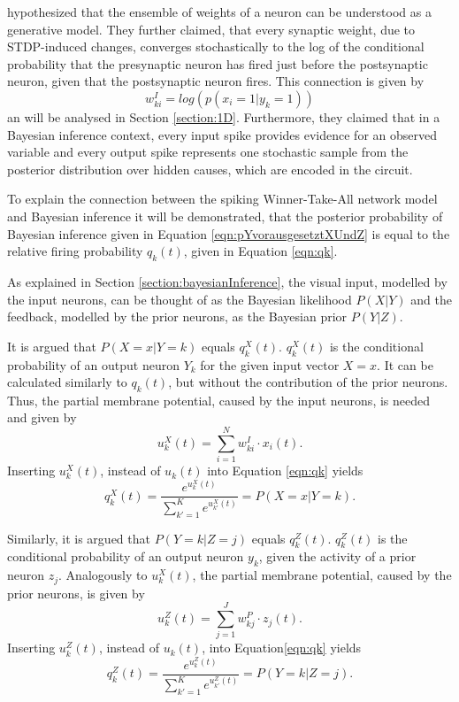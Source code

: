 \citet{nessler} hypothesized that the ensemble of weights of a neuron can be understood as a generative model. They further claimed, that every synaptic weight, due to STDP-induced changes,  converges stochastically to the log of the conditional probability that the presynaptic neuron has fired just before the postsynaptic neuron, given that the postsynaptic neuron fires. This connection is given by
\begin{equation}
\label{eqn:weightProbLink}
 w^{I}_{ki} = log(p(x_i = 1 | y_k = 1))
\end{equation}
an will be analysed in Section \ref{section:1D}.
Furthermore, they claimed that in a Bayesian inference context, every input spike provides evidence for an observed variable and every output spike represents one stochastic sample from the posterior distribution over hidden causes, which are encoded in the circuit. 

To explain the connection between the spiking Winner-Take-All network model and Bayesian inference it will be demonstrated, that the posterior probability of Bayesian inference given in Equation \ref{eqn:pYvorausgesetztXUndZ} is equal to the relative firing probability $q_k(t)$, given in Equation \ref{eqn:qk}.

As explained in Section \ref{section:bayesianInference}, the visual input, modelled by the input neurons, can be thought of as the Bayesian likelihood $P(X|Y)$ and the feedback, modelled by the prior neurons, as the Bayesian prior $P(Y|Z)$.

It is argued that $P(X=x|Y=k)$ equals $q_k^X(t)$. $q_k^X(t)$ is the conditional probability of an output neuron $Y_k$ for the given input vector $X=x$. It can be calculated similarly to $q_k(t)$, but without the contribution of the prior neurons. Thus, the partial membrane potential, caused by the input neurons, is needed and given by 
\begin{equation}
u_k^X(t) = \sum_{i=1}^N w^{I}_{ki} \cdot x_i(t).
\end{equation}
Inserting $u_k^X(t)$, instead of $u_k(t)$ into Equation \ref{eqn:qk} yields
\begin{equation}
q_k^X(t) = \frac{e^{u_k^X(t)}}{\sum_{k'=1}^K e^{u_{k'}^X(t)}} = P(X=x|Y=k).
\end{equation}

Similarly, it is argued that $P(Y=k|Z=j)$ equals $q_k^Z(t)$. $q_k^Z(t)$ is the conditional probability of an output neuron $y_k$, given the activity of a prior neuron $z_j$.  
Analogously to $u_k^X(t)$, the partial membrane potential, caused by the prior neurons, is given by
\begin{equation}
u_k^Z(t) = \sum_{j=1}^J w^{P}_{kj} \cdot z_j(t).
\end{equation}
Inserting $u_k^Z(t)$, instead of $u_k(t)$, into Equation\ref{eqn:qk} yields
\begin{equation}
q_k^Z(t) = \frac{e^{u_k^Z(t)}}{\sum_{k'=1}^K e^{u_{k'}^Z(t)}} = P(Y=k|Z=j).
\end{equation}

